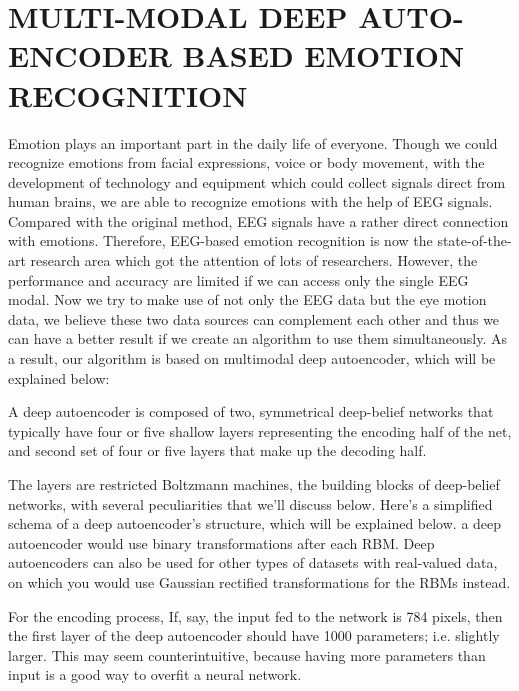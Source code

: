 
\chapter{MULTI-MODAL DEEP AUTO-ENCODER BASED EMOTION RECOGNITION}
\label{chap:english_summary}

	Emotion plays an important part in the daily life of everyone. Though we could recognize emotions from facial expressions, voice or body movement, with the development of technology and equipment which could collect signals direct from human brains, we are able to recognize emotions with the help of EEG signals. Compared with the original method, EEG signals have a rather direct connection with emotions. Therefore, EEG-based emotion recognition is now the state-of-the-art research area which got the attention of lots of researchers. However, the performance and accuracy are limited if we can access only the single EEG modal.  Now we try to make use of not only the EEG data but the eye motion data, we believe these two data sources can complement each other and thus we can have a better result if we create an algorithm to use them simultaneously. As a result, our algorithm is based on multimodal deep autoencoder, which will be explained below:

	A deep autoencoder is composed of two, symmetrical deep-belief networks that typically have four or five shallow layers representing the encoding half of the net, and second set of four or five layers that make up the decoding half.

	The layers are restricted Boltzmann machines, the building blocks of deep-belief networks, with several peculiarities that we’ll discuss below. Here’s a simplified schema of a deep autoencoder’s structure, which will be  explained below. a deep autoencoder would use binary transformations after each RBM. Deep autoencoders can also be used for other types of datasets with real-valued data, on which you would use Gaussian rectified transformations for the RBMs instead.

	For the encoding process, If, say, the input fed to the network is 784 pixels, then the first layer of the deep autoencoder should have 1000 parameters; i.e. slightly larger.
This may seem counterintuitive, because having more parameters than input is a good way to overfit a neural network.

